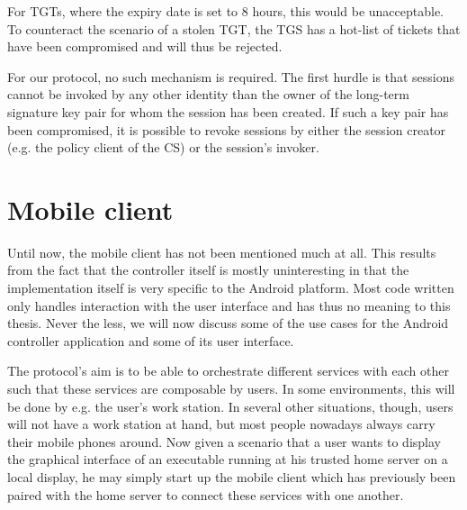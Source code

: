 For TGTs, where the expiry date is set to 8 hours, this would be unacceptable.
To counteract the scenario of a stolen TGT, the TGS has a hot-list of tickets that have been compromised and will thus be rejected.

For our protocol, no such mechanism is required.
The first hurdle is that sessions cannot be invoked by any other identity than the owner of the long-term signature key pair for whom the session has been created.
If such a key pair has been compromised, it is possible to revoke sessions by either the session creator (e.g. the policy client of the CS) or the session's invoker.

\section{Mobile client}

Until now, the mobile client has not been mentioned much at all.
This results from the fact that the controller itself is mostly uninteresting in that the implementation itself is very specific to the Android platform.
Most code written only handles interaction with the user interface and has thus no meaning to this thesis.
Never the less, we will now discuss some of the use cases for the Android controller application and some of its user interface.

The protocol's aim is to be able to orchestrate different services with each other such that these services are composable by users.
In some environments, this will be done by e.g. the user's work station.
In several other situations, though, users will not have a work station at hand, but most people nowadays always carry their mobile phones around.
Now given a scenario that a user wants to display the graphical interface of an executable running at his trusted home server on a local display, he may simply start up the mobile client which has previously been paired with the home server to connect these services with one another.

